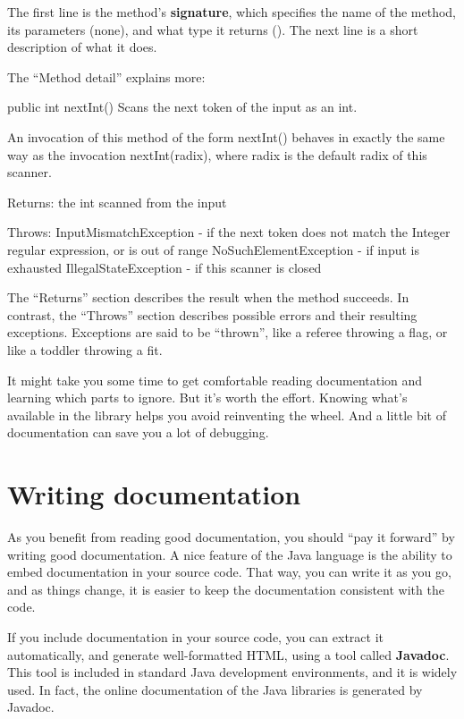 
The first line is the method's {\bf signature}, which specifies the name of the method, its parameters (none), and what type it returns ().
The next line is a short description of what it does.

The ``Method detail'' explains more:

\begin{stdout}
public int nextInt()
Scans the next token of the input as an int.

An invocation of this method of the form nextInt() behaves in
exactly the same way as the invocation nextInt(radix), where
radix is the default radix of this scanner.

Returns:
the int scanned from the input

Throws:
InputMismatchException - if the next token does not match
    the Integer regular expression, or is out of range
NoSuchElementException - if input is exhausted
IllegalStateException - if this scanner is closed
\end{stdout}

The ``Returns'' section describes the result when the method succeeds.
In contrast, the ``Throws'' section describes possible errors and their resulting exceptions.
Exceptions are said to be ``thrown'', like a referee throwing a flag, or like a toddler throwing a fit.

It might take you some time to get comfortable reading documentation and learning which parts to ignore.
But it's worth the effort.
Knowing what's available in the library helps you avoid reinventing the wheel.
And a little bit of documentation can save you a lot of debugging.


\section{Writing documentation}
\label{sec:javadoc}

As you benefit from reading good documentation, you should ``pay it forward'' by writing good documentation.
A nice feature of the Java language is the ability to embed documentation in your source code.
That way, you can write it as you go, and as things change, it is easier to keep the documentation consistent with the code.


If you include documentation in your source code, you can extract it automatically, and generate well-formatted HTML, using a tool called {\bf Javadoc}.
This tool is included in standard Java development environments, and it is widely used.
In fact, the online documentation of the Java libraries is generated by Javadoc.

